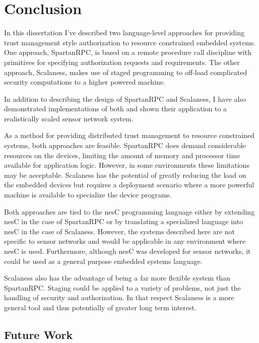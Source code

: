 
\chapter{Conclusion}
\label{chapter-conclusion}


In this dissertation I've described two language-level approaches for providing trust management
style authorization to resource constrained embedded systems. One approach, SpartanRPC, is based
on a remote procedure call discipline with primitives for specifying authorization requests and
requirements. The other approach, Scalaness, makes use of staged programming to off-load
complicated security computations to a higher powered machine.

In addition to describing the design of SpartanRPC and Scalaness, I have also demonstrated
implementations of both and shown their application to a realistically scaled sensor network
system.

As a method for providing distributed trust management to resource constrained systems, both
approaches are feasible. SpartanRPC does demand considerable resources on the devices, limiting
the amount of memory and processor time available for application logic. However, in some
environments these limitations may be acceptable. Scalaness has the potential of greatly
reducing the load on the embedded devices but requires a deployment scenario where a more
powerful machine is available to specialize the device programs.

Both approaches are tied to the nesC programming language either by extending nesC in the case
of SpartanRPC or by translating a specialized language into nesC in the case of Scalaness.
However, the systems described here are not specific to sensor networks and would be applicable
in any environment where nesC is used. Furthermore, although nesC was developed for sensor
networks, it could be used as a general purpose embedded systems language.

Scalaness also has the advantage of being a far more flexible system than SpartanRPC. Staging
could be applied to a variety of problems, not just the handling of security and authorization.
In that respect Scalaness is a more general tool and thus potentially of greater long term
interest.

\section{Future Work}
\label{section-future-work}

